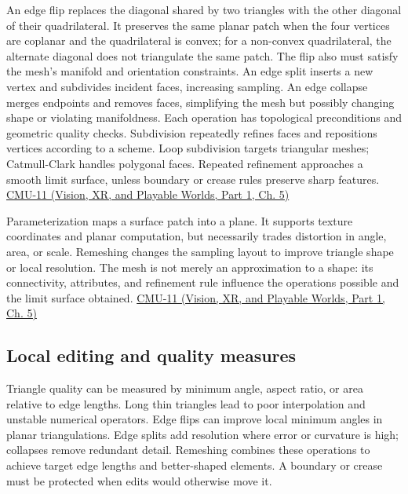 An edge flip replaces the diagonal shared by two triangles with the other diagonal of their quadrilateral. It preserves the same planar patch when the four vertices are coplanar and the quadrilateral is convex; for a non-convex quadrilateral, the alternate diagonal does not triangulate the same patch. The flip also must satisfy the mesh's manifold and orientation constraints. An edge split inserts a new vertex and subdivides incident faces, increasing sampling. An edge collapse merges endpoints and removes faces, simplifying the mesh but possibly changing shape or violating manifoldness. Each operation has topological preconditions and geometric quality checks. Subdivision repeatedly refines faces and repositions vertices according to a scheme. Loop subdivision targets triangular meshes; Catmull-Clark handles polygonal faces. Repeated refinement approaches a smooth limit surface, unless boundary or crease rules preserve sharp features. \href{../07-Vision-XR-and-Playable-Worlds-P01/main.pdf\#nameddest=04-visual-computing-ii-ch036-cmu-11---digital-geometry-processing}{CMU-11 (Vision, XR, and Playable Worlds, Part 1, Ch. 5)}

Parameterization maps a surface patch into a plane. It supports texture coordinates and planar computation, but necessarily trades distortion in angle, area, or scale. Remeshing changes the sampling layout to improve triangle shape or local resolution. The mesh is not merely an approximation to a shape: its connectivity, attributes, and refinement rule influence the operations possible and the limit surface obtained. \href{../07-Vision-XR-and-Playable-Worlds-P01/main.pdf\#nameddest=04-visual-computing-ii-ch036-cmu-11---digital-geometry-processing}{CMU-11 (Vision, XR, and Playable Worlds, Part 1, Ch. 5)}

\subsection{Local editing and quality measures}\label{03-visual-computing-i-ch002-local-editing-and-quality-measures}

\hypertarget{03-visual-computing-i-ch002-local-editing-and-quality-measures}{}

Triangle quality can be measured by minimum angle, aspect ratio, or area relative to edge lengths. Long thin triangles lead to poor interpolation and unstable numerical operators. Edge flips can improve local minimum angles in planar triangulations. Edge splits add resolution where error or curvature is high; collapses remove redundant detail. Remeshing combines these operations to achieve target edge lengths and better-shaped elements. A boundary or crease must be protected when edits would otherwise move it.

